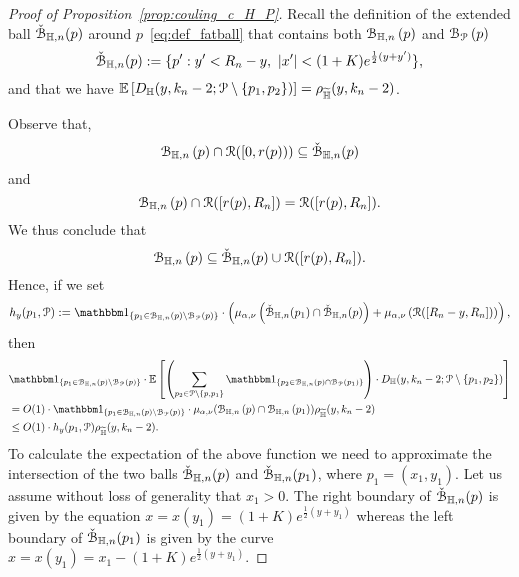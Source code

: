 \begin{proof}[Proof of Proposition~\ref{prop:couling_c_H_P}]
Recall the definition of the extended ball $\check{{\mathcal B}}_{\mathbb{H},n}(p)$ around $p$~\eqref{eq:def_fatball} that contains both ${\mathcal B}_{\mathbb{H},n}\left(p\right)$ and ${\mathcal B}_{{\mathcal P}}\left(p\right)$ 
\[
	\check{{\mathcal B}}_{\mathbb{H},n}(p) : = \{ p^\prime : y^\prime < R_n - y, \ |x^\prime| < (1+K) e^{\frac{1}{2} (y + y^\prime)}  \},
\]
and that we have $\mathbb{E}\left[D_{\mathbb{H}} (y,k_n-2;{\mathcal P} \setminus \{ p_1,p_2\})\right] = \rho_{\widetilde{\mathbb{H}}}(y,k_n-2)$.

Observe that,
\begin{equation*} %
\BallHyp{p} \cap \Rcal ([0,r(p))) \subseteq \FatBallHyp{p}
\end{equation*}
and 
\begin{equation*} %
\BallHyp{p} \cap \Rcal ([r(p),R_n]) = \Rcal ([r(p),R_n]).
\end{equation*}
We thus conclude that 
\begin{equation} \label{eq:ball_inclusions}
{\mathcal B}_{\mathbb{H},n}\left(p\right) \subseteq \check{{\mathcal B}}_{\mathbb{H},n}(p) \cup {\mathcal R}([r(p),R_n]).
\end{equation}
Hence, if we set 
\[
h_y(p_1, \Pcal) := \ind{p_1 \in \BallHyp{p}\setminus \BallPo{p}} \cdot    
\left( \mu_{\alpha,\nu} \left( \FatBallHyp{p_1} \cap \FatBallHyp{p} \right)
+ \mu_{\alpha,\nu} \left( \Rcal([R_n-y,R_n]) \right) \right),
\]
then 
\begin{align*}
&\ind{p_1\in \BallHyp{p}\setminus \BallPo{p}} \cdot \Exp{ \left(\sum_{p_2 \in \Pcal \setminus 
\{p,p_1\}} \ind{p_2 \in \BallHyp{p} \cap \BallPo{p_1}}\right) \cdot 
D_\H (y,k_n-2;\Pcal \setminus \{ p_1, p_2\})
} \\
&=O(1)\cdot
\ind{p_1\in \BallHyp{p}\setminus \BallPo{p}} \cdot \mu_{\alpha,\nu} (\BallHyp{p}\cap \BallHyp{p_1}) \rho_{\HP}(y,k_n-2) \\
& \leq O(1) \cdot  h_y (p_1, \Pcal) \rho_{\HP}(y,k_n-2) . 
\end{align*}
To calculate the expectation of the above function we need to approximate the 
intersection of the two balls $\check{{\mathcal B}}_{\mathbb{H},n}(p)$ and $\check{{\mathcal B}}_{\mathbb{H},n}(p_1)$, 
where $p_1= (x_1,y_1)$. 
Let us assume without loss of generality that $x_1 > 0$. 
The right boundary of $\check{{\mathcal B}}_{\mathbb{H},n}(p)$ is given by the equation 
$x = x(y_1) = (1+K)e^{\frac{1}{2} (y + y_1)}$ whereas the left boundary of $\check{{\mathcal B}}_{\mathbb{H},n}(p_1)$ is given by the curve $x = x(y_1)= x_1 - (1+ K)e^{\frac{1}{2} (y + y_1)}.$ 


\end{proof}
